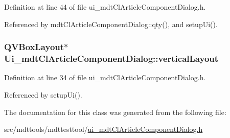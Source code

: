 Definition at line 44 of file ui\-\_\-mdt\-Cl\-Article\-Component\-Dialog.\-h.



Referenced by mdt\-Cl\-Article\-Component\-Dialog\-::qty(), and setup\-Ui().

\hypertarget{class_ui__mdt_cl_article_component_dialog_a6b4d1dd089ef4bc86bb4bd1913985e80}{
\subsubsection[{vertical\-Layout}]{\setlength{\rightskip}{0pt plus 5cm}Q\-V\-Box\-Layout$\ast$ Ui\-\_\-mdt\-Cl\-Article\-Component\-Dialog\-::vertical\-Layout}}\label{class_ui__mdt_cl_article_component_dialog_a6b4d1dd089ef4bc86bb4bd1913985e80}


Definition at line 34 of file ui\-\_\-mdt\-Cl\-Article\-Component\-Dialog.\-h.



Referenced by setup\-Ui().



The documentation for this class was generated from the following file\-:\begin{DoxyCompactItemize}
\item 
src/mdttools/mdttesttool/\hyperlink{ui__mdt_cl_article_component_dialog_8h}{ui\-\_\-mdt\-Cl\-Article\-Component\-Dialog.\-h}\end{DoxyCompactItemize}
